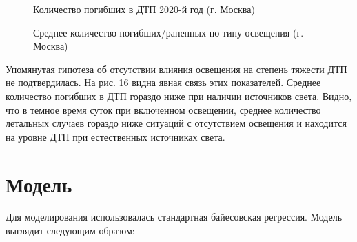 \documentclass[a4paper, 14pt]{article}
\begin{document}
\begin{figure}[h]
	\caption{Количество погибших в ДТП 2020-й год (г. Москва)}
\end{figure}


\begin{figure}[h]
	\caption{Среднее количество погибших/раненных по типу освещения (г. Москва)}
\end{figure}



Упомянутая гипотеза об отсутствии влияния освещения на степень тяжести ДТП не подтвердилась. На рис. 16 видна явная связь этих показателей. Среднее количество погибших в ДТП гораздо ниже при наличии источников света. Видно, что в темное время суток при включенном освещении, среднее количество летальных случаев гораздо ниже ситуаций с отсутствием освещения и находится на уровне ДТП при естественных источниках света.

\section{Модель}

Для моделирования использовалась стандартная байесовская регрессия. Модель выглядит следующим образом:
\end{document}
